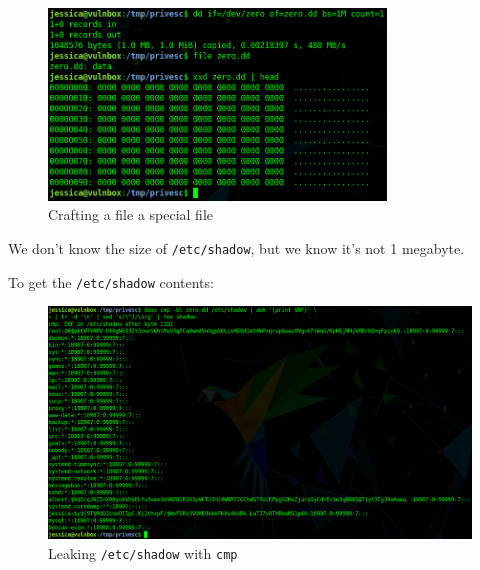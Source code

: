 \documentclass[12pt]{article}
\begin{document}
    \begin{figure}[H]\label{pic:67-dd-zero}
        \centering
        \includegraphics[width=0.80\textwidth]{67-dd-zero.png}
        \caption{Crafting a file a special file}
    \end{figure}

    We don't know the size of \texttt{/etc/shadow}, but we know it's not 1
    megabyte.

    To get the \texttt{/etc/shadow} contents:

    \begin{figure}[H]\label{pic:68-cmp-shadow}
        \centering
        \includegraphics[width=1.00\textwidth]{68-cmp-shadow.png}
        \caption{Leaking \texttt{/etc/shadow} with \texttt{cmp}}
    \end{figure}
\end{document}
